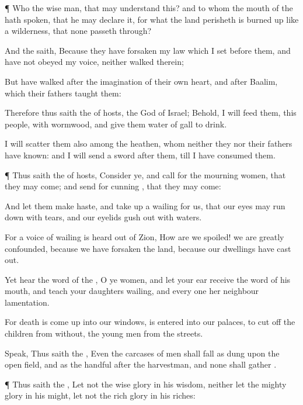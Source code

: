 {\par }{\PP {}¶ Who
{} the
wise
man, that may
understand this? and
{} to whom the
mouth of the
{} hath
spoken, that he may
declare it, for what the
land
perisheth
{} is burned
up like a
wilderness, that none passeth
through?

And the
{}
saith, Because they have
forsaken my
law which I
set
before them, and have not
obeyed my
voice, neither
walked therein;

But have
walked
after the
imagination of their own
heart, and
after
Baalim, which their
fathers
taught them:

Therefore thus
saith the
{} of
hosts, the
God of
Israel; Behold, I will
feed them,
{} this
people, with
wormwood, and give them
water of
gall to
drink.

I will
scatter them also among the
heathen, whom neither they nor their
fathers have
known: and I will
send a
sword
after them, till I have
consumed them.


\par }{\PP {}¶ Thus
saith the
{} of
hosts,
Consider ye, and
call for the mourning
women, that they may
come; and
send for
cunning
{}, that they may
come:

And let them make
haste, and take
up a
wailing for us, that our
eyes may run
down with
tears, and our
eyelids gush
out with
waters.

For a
voice of
wailing is
heard out of
Zion, How are we
spoiled! we are
greatly
confounded, because we have
forsaken the
land, because our
dwellings have cast
{}
out.

Yet
hear the
word of the
{}, O ye
women, and let your
ear
receive the
word of his
mouth, and
teach your
daughters
wailing, and every
one her
neighbour
lamentation.

For
death is come
up into our
windows,
{} is
entered into our
palaces, to cut
off the
children from
without,
{} the young
men from the
streets.

Speak, Thus
saith the
{}, Even the
carcases of
men shall
fall as
dung upon the
open
field, and as the
handful
after the
harvestman, and none shall
gather
{}.


\par }{\PP {}¶ Thus
saith the
{}, Let not the
wise
{}
glory in his
wisdom, neither let the
mighty
{}
glory in his
might, let not the
rich
{}
glory in his
riches:

}

